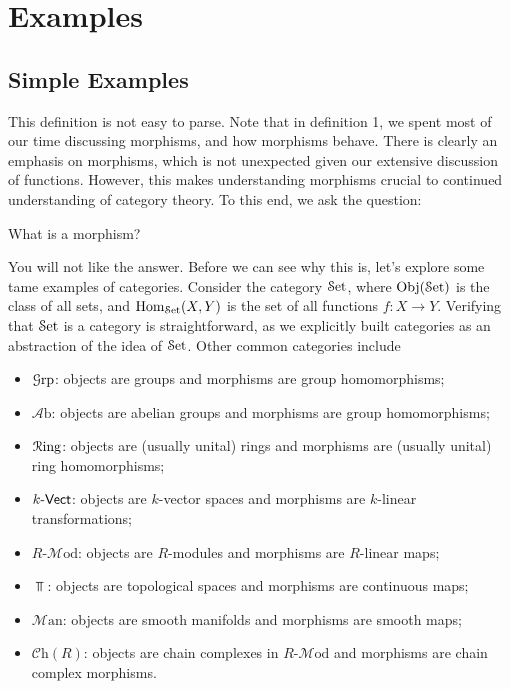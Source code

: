 \section{Examples}

\subsection{Simple Examples}

This definition is not easy to parse. Note that in definition 1, we spent most of our time discussing morphisms, and how morphisms behave. There is clearly an emphasis on morphisms, which is not unexpected given our extensive discussion of functions. However, this makes understanding morphisms crucial to continued understanding of category theory. To this end, we ask the question:
\begin{center}
	What is a morphism?
\end{center}

You will not like the answer. Before we can see why this is, let's explore some tame examples of categories. Consider the category $\mathcal{S}\mathrm{et} $, where $\operatorname{Obj}(\mathcal{S}\mathrm{et} ) $ is the class of all sets, and $\operatorname{Hom}_{\mathcal{S}\mathrm{et} }(X, Y) $ is the set of all functions $f: X \to Y$. Verifying that $\mathcal{S}\mathrm{et} $ is a category is straightforward, as we explicitly built categories as an abstraction of the idea of $\mathcal{S}\mathrm{et} $. Other common categories include
\begin{itemize}
	\item $\mathcal{G}\mathrm{rp} $: objects are groups and morphisms are group homomorphisms;
	\item $\mathcal{A} \mathrm{b} $: objects are abelian groups and morphisms are group homomorphisms;
	\item $\mathcal{R}\mathrm{ing} $: objects are (usually unital) rings and morphisms are (usually unital) ring homomorphisms;
	\item $k\text{-}\mathsf{Vect} $: objects are $k$-vector spaces and morphisms are $k$-linear transformations;
	\item $R$-$\mathcal{M}\mathrm{od}$: objects are $R$-modules and morphisms are $R$-linear maps;
	\item $\Top $: objects are topological spaces and morphisms are continuous maps;
	\item $\mathcal{M}\mathrm{an} $: objects are smooth manifolds and morphisms are smooth maps;
	\item $\mathcal{C}\mathrm{h}(R)$: objects are chain complexes in $R$-$\mathcal{M} \mathrm{od} $ and morphisms are chain complex morphisms.
\end{itemize}

